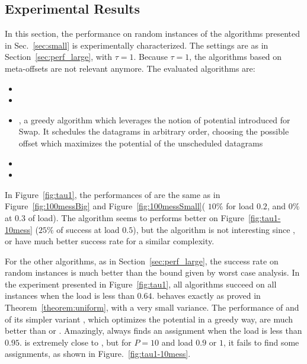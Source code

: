\subsection{Experimental Results} \label{sec:perf_small}


In this section, the performance on random instances of the algorithms presented in Sec.~\ref{sec:small} is experimentally characterized. The settings are as in Section~\ref{sec:perf_large}, with $\tau = 1$.
Because $\tau =1$, the algorithms based on meta-offsets are not relevant anymore. The evaluated algorithms are:


\begin{itemize}
  \item \firstfit
  \item \greedyuniform 
  \item \greedypotential, a greedy algorithm which leverages the notion of potential introduced for Swap. 
  It schedules the datagrams in arbitrary order, choosing the possible offset which maximizes the potential of the unscheduled datagrams
  \item \swapandmove 
  \item \ESCA
\end{itemize}

In Figure~\ref{fig:tau1}, the performances of \shortestlongest are the same as in Figure~\ref{fig:100messBig} and Figure~\ref{fig:100messSmall}( $10\%$ for load  $0.2$, and $0\%$ at $0.3$ of load). The algorithm seems to performs better on Figure~\ref{fig:tau1-10mess} ($25\%$ of success at load $0.5$), but the algorithm is not interesting since \greedypotential, \firstfit or \greedyuniform have much better success rate for a similar complexity.

For the other algorithms, as in Section~\ref{sec:perf_large}, the success rate on random instances is much better than the bound given by worst case analysis. In the experiment presented in Figure~\ref{fig:tau1}, all algorithms succeed on all instances when the load is less than $0.64$. \greedyuniform behaves exactly as proved in Theorem~\ref{theorem:uniform}, with a very small variance. The performance of \swapandmove and of its simpler variant \greedypotential, which optimizes the potential in a greedy way, are much better than \firstfit or \greedyuniform. Amazingly, \swapandmove always finds an assignment when the load is less than $0.95$. \swapandmove is extremely close to \ESCA, but for $P=10$ and load $0.9$ or $1$, it fails to find some assignments, as shown in Figure.~\ref{fig:tau1-10mess}.

